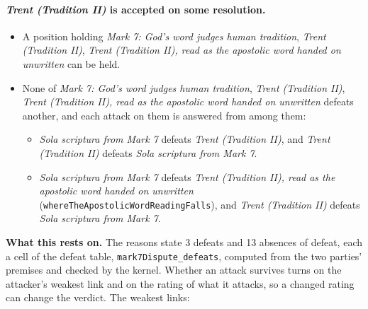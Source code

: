 \documentclass[11pt]{article}
\begin{document}
\paragraph{\emph{Trent (Tradition II)} is accepted on some resolution.}
\begin{itemize}
\item A position holding \emph{Mark 7: God’s word judges human tradition}, \emph{Trent (Tradition II)}, \emph{Trent (Tradition II), read as the apostolic word handed on unwritten} can be held.
\item None of \emph{Mark 7: God’s word judges human tradition}, \emph{Trent (Tradition II)}, \emph{Trent (Tradition II), read as the apostolic word handed on unwritten} defeats another, and each attack on them is answered from among them:
\begin{itemize}
\item \emph{Sola scriptura from Mark 7} defeats \emph{Trent (Tradition II)}, and \emph{Trent (Tradition II)} defeats \emph{Sola scriptura from Mark 7}.
\item \emph{Sola scriptura from Mark 7} defeats \emph{Trent (Tradition II), read as the apostolic word handed on unwritten} (\texttt{where\allowbreak{}The\allowbreak{}Apostolic\allowbreak{}Word\allowbreak{}Reading\allowbreak{}Falls}), and \emph{Trent (Tradition II)} defeats \emph{Sola scriptura from Mark 7}.
\end{itemize}
\end{itemize}
\par\noindent\textbf{What this rests on.} The reasons state 3 defeats and 13 absences of defeat, each a cell of the defeat table, \texttt{mark7\allowbreak{}Dispute\_\allowbreak{}defeats}, computed from the two parties' premises and checked by the kernel. Whether an attack survives turns on the attacker's weakest link and on the rating of what it attacks, so a changed rating can change the verdict. The weakest links:
\end{document}
